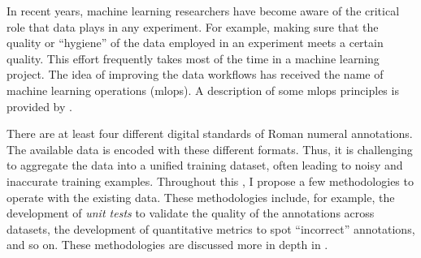 

In recent years, machine learning researchers have become
aware of the critical role that data plays in any
experiment. For example, making sure that the quality or
``hygiene'' of the data employed in an experiment meets a
certain quality. This effort frequently takes most of the
time in a machine learning project. The idea of improving
the data workflows has received the name of machine learning
operations (\gls{mlops}). A description of some \gls{mlops} principles
is provided by \textcite{renggli2021data}.

There are at least four different digital standards of Roman
numeral annotations. The available data is encoded with
these different formats. Thus, it is challenging to
aggregate the data into a unified training dataset, often
leading to noisy and inaccurate training examples.
Throughout this \thesisdiss{}, I propose a few methodologies
to operate with the existing data. These methodologies
include, for example, the development of \emph{unit tests}
to validate the quality of the annotations across datasets,
the development of quantitative metrics to spot
``incorrect'' annotations, and so on. These methodologies
are discussed more in depth in .
